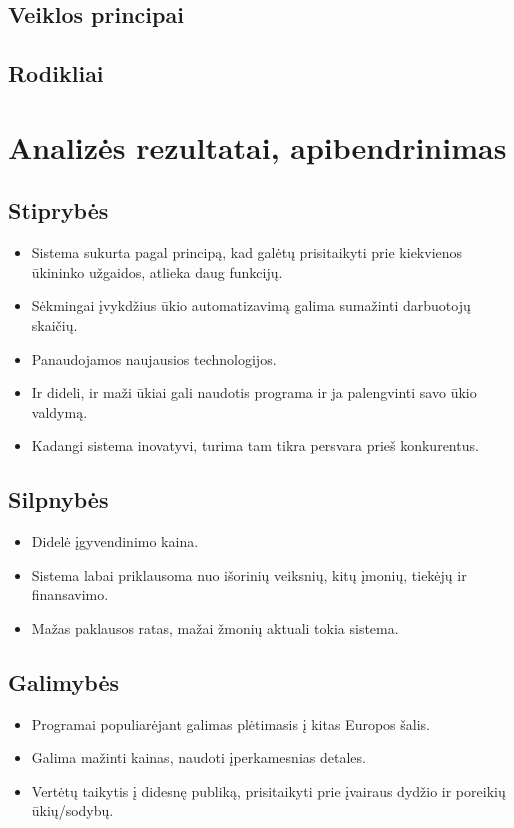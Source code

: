 \documentclass[oneside]{VUMIFPSkursinis}
\begin{document}
	\subsection{Veiklos principai}
	\subsection{Rodikliai}
\section{Analizės rezultatai, apibendrinimas}
	\subsection{Stiprybės}
	\begin{itemize}
	\item Sistema sukurta pagal principą, kad galėtų prisitaikyti prie kiekvienos ūkininko užgaidos, atlieka daug funkcijų.
	\item Sėkmingai įvykdžius ūkio automatizavimą galima sumažinti darbuotojų skaičių.
	\item Panaudojamos naujausios technologijos.
	\item Ir dideli, ir maži ūkiai gali naudotis programa ir ja palengvinti savo ūkio valdymą.
	\item Kadangi sistema inovatyvi, turima tam tikra persvara prieš konkurentus.
	\end{itemize}
	\subsection{Silpnybės}
	\begin{itemize}
	\item Didelė įgyvendinimo kaina.
	\item Sistema labai priklausoma nuo išorinių veiksnių, kitų įmonių, tiekėjų ir finansavimo.
	\item Mažas paklausos ratas, mažai žmonių aktuali tokia sistema.
	\end{itemize}
	\subsection{Galimybės}
	\begin{itemize}
	\item Programai populiarėjant galimas plėtimasis į kitas Europos šalis.
	\item Galima mažinti kainas, naudoti įperkamesnias detales.
	\item Vertėtų taikytis į didesnę publiką, prisitaikyti prie įvairaus dydžio ir poreikių ūkių/sodybų.
	\end{itemize}
\end{document}

